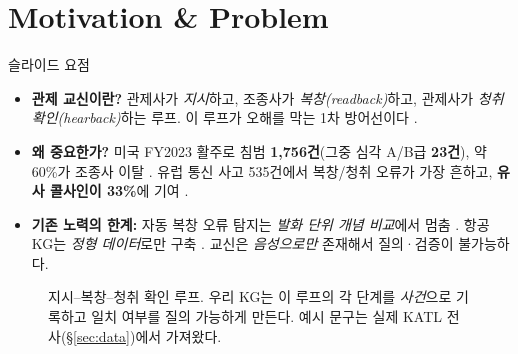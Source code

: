 \documentclass[10pt,a4paper]{article}
\begin{document}
\section{Motivation \& Problem}
\begin{keybox}{슬라이드 요점}
\begin{itemize}[leftmargin=12pt]
\item \textbf{관제 교신이란?} 관제사가 \emph{지시}하고, 조종사가 \emph{복창(readback)}하고, 관제사가 \emph{청취 확인(hearback)}하는 루프. 이 루프가 오해를 막는 1차 방어선이다 \cite{faa7110}.
\item \textbf{왜 중요한가?} 미국 FY2023 활주로 침범 \textbf{1,756건}(그중 심각 A/B급 \textbf{23건}), 약 60\%가 조종사 이탈 \cite{faaincursion}. 유럽 통신 사고 535건에서 복창/청취 오류가 가장 흔하고, \textbf{유사 콜사인이 33\%}에 기여 \cite{eurocontrol}.
\item \textbf{기존 노력의 한계:} 자동 복창 오류 탐지는 \emph{발화 단위 개념 비교}에서 멈춤 \cite{helmke2021}. 항공 KG는 \emph{정형 데이터}로만 구축 \cite{keller2019,schrefl2022}. 교신은 \emph{음성으로만} 존재해서 질의·검증이 불가능하다.
\end{itemize}
\end{keybox}

\begin{figure}[h!]
\centering
{}
\caption{지시--복창--청취 확인 루프. 우리 KG는 이 루프의 각 단계를 \emph{사건}으로 기록하고 일치 여부를 질의 가능하게 만든다. 예시 문구는 실제 KATL 전사(\S\ref{sec:data})에서 가져왔다.}
\end{figure}
\end{document}
